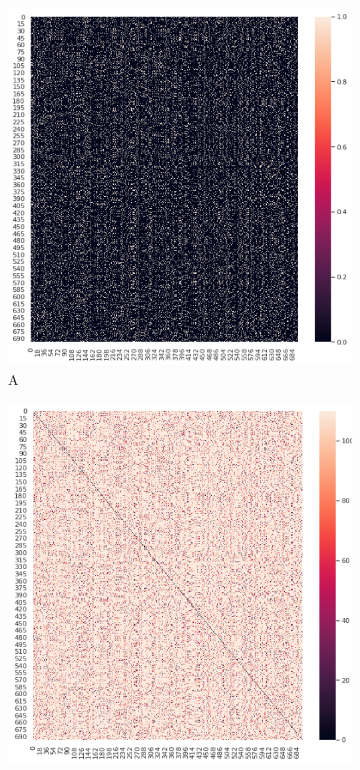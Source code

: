 \documentclass[a4paper]{article}
\begin{document}
\begin{figure}[h]
    \centering
    \begin{subfigure}[b]{0.3\textwidth}
        \includegraphics[width=\textwidth]{a.png}
        \caption{A}
        \label{A}
    \end{subfigure}
    \begin{subfigure}[b]{0.3\textwidth}
        \includegraphics[width=\textwidth]{w.png}

\end{subfigure}
\end{figure}
\end{document}
